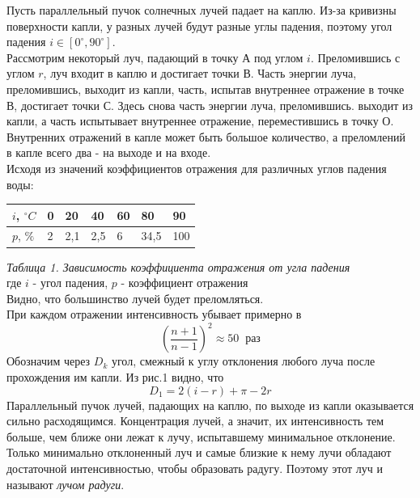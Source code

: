 \documentclass[a4paper]{article}
\begin{document}
\begin{multicols}{2}
\begin{enumerate}
Пусть параллельный пучок солнечных лучей падает на каплю. Из-за кривизны поверхности капли, у разных лучей будут разные углы падения, поэтому угол падения $i \in [0^{\circ},90^{\circ}]$.\\ Рассмотрим некоторый луч, падающий в точку А под углом $i$. Преломившись с углом $r$, луч входит в каплю и достигает точки В. Часть энергии луча, преломившись, выходит из капли, часть, испытав внутреннее отражение в точке В, достигает точки С. Здесь снова часть энергии луча, преломившись. выходит из капли, а часть испытывает внутреннее отражение, переместившись в точку О. Внутренних отражений в капле может быть большое количество, а преломлений в капле всего два - на выходе и на входе.\\
Исходя из значений коэффициентов отражения для различных углов падения воды:\\
\begin{center}
\begin{tabular}{|l|l|l|l|l|l|l|}
\hline
$i$, $^{\circ}C$ & 0 & 20 & 40 & 60 & 80 & 90\\
\hline
$p$, $\%$ & 2 & 2,1 & 2,5 & 6 & 34,5 & 100\\
\hline
\end{tabular}
\end{center}
\textit{Таблица 1. Зависимость коэффициента отражения от угла падения}\\
где $i$ - угол падения, $p$ - коэффициент отражения\\
Видно, что большинство лучей будет преломляться.\\
При каждом отражении интенсивность убывает примерно в $$(\frac{n+1}{n-1})^2 \approx 50 \; \; \textit{раз}$$
Обозначим через $D_k$ угол, смежный к углу отклонения любого луча после прохождения им капли. Из рис.1 видно, что 
\begin{equation}
D_1 = 2(i - r) + \pi - 2r
\label{short}
\end{equation}
Параллельный пучок лучей, падающих на каплю, по выходе из капли оказывается сильно расходящимся. Концентрация лучей, а значит, их интенсивность тем больше, чем ближе они лежат к лучу, испытавшему минимальное отклонение. Только минимально отклоненный луч и самые близкие к нему лучи обладают достаточной интенсивностью, чтобы образовать радугу. Поэтому этот луч и называют \textit{лучом радуги}.\\


\end{enumerate}
\end{multicols}
\end{document}
